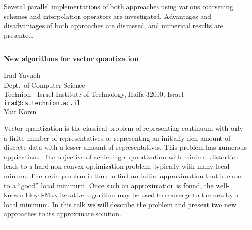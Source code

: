 \documentclass[twosided]{report}
\begin{document}
Several parallel implementations of both approaches using
various coarsening schemes and interpolation operators are
investigated. Advantages and disadvantages of both
approaches are discussed, and numerical results are
presented.



	\begin{center} \rule{6in}{1pt} \end{center}

\begin{center}
{\large			%
{\bf New algorithms for vector quantization}}

	Irad Yavneh \\
	Dept.~of Computer Science \\
	Technion - Israel Institute of Technology, Haifa 32000, Israel \\
	{\tt irad@cs.technion.ac.il} \\
	Yair Koren
\end{center}
Vector quantization is the classical problem of representing
continuum with only a finite number of representatives or
representing an initially rich amount of discrete data with
a lesser amount of representatives. This problem has
numerous applications. The objective of achieving a
quantization with minimal distortion leads to a hard
non-convex optimization problem, typically with many local
minima. The main problem is thus to find an initial
approximation that is close to a ``good'' local minimum.
Once such an approximation is found, the well-known
Lloyd-Max iterative algorithm may be used to converge to the
nearby a local minimum. In this talk we will describe the
problem and present two new approaches to its approximate
solution.



	\begin{center} \rule{6in}{1pt} \end{center}
\end{document}
